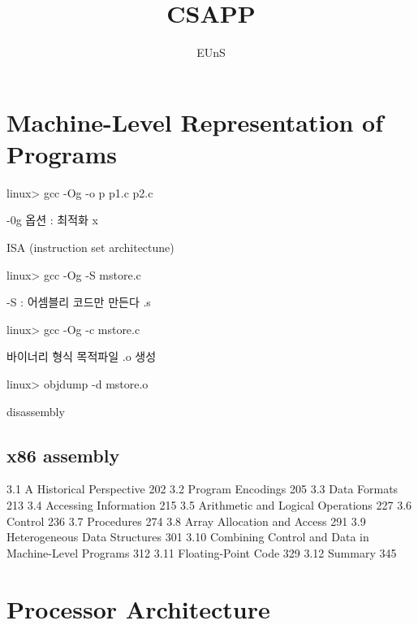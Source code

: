\documentclass{memoir}
\begin{document}
    
\title{CSAPP}
\author{ EUnS }

\maketitle

\tableofcontents




\chapter{Machine-Level Representation of Programs}


linux> gcc -Og -o p p1.c p2.c


-0g 옵션 : 최적화 x

ISA (instruction set architectune)

linux> gcc -Og -S mstore.c

-S : 어셈블리 코드만 만든다 .s

linux> gcc -Og -c mstore.c

바이너리 형식 목적파일 .o  생성


linux> objdump -d mstore.o

disassembly


\section{x86 assembly}











3.1 A Historical Perspective 202
3.2 Program Encodings 205
3.3 Data Formats 213
3.4 Accessing Information 215
3.5 Arithmetic and Logical Operations 227
3.6 Control 236
3.7 Procedures 274
3.8 Array Allocation and Access 291
3.9 Heterogeneous Data Structures 301
3.10 Combining Control and Data in Machine-Level Programs 312
3.11 Floating-Point Code 329
3.12 Summary 345

\chapter{Processor Architecture}
\end{document}
